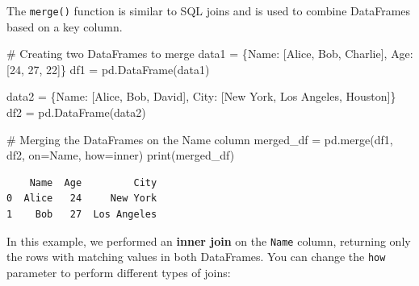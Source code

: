 \documentclass[
  letterpaper,
  DIV=11,
  numbers=noendperiod]{scrreprt}
\newenvironment{Shaded}{\begin{snugshade}}{\end{snugshade}}
\newcommand{\BuiltInTok}[1]{\textcolor[rgb]{0.00,0.23,0.31}{#1}}
\newcommand{\CommentTok}[1]{\textcolor[rgb]{0.37,0.37,0.37}{#1}}
\newcommand{\DecValTok}[1]{\textcolor[rgb]{0.68,0.00,0.00}{#1}}
\newcommand{\NormalTok}[1]{\textcolor[rgb]{0.00,0.23,0.31}{#1}}
\newcommand{\OperatorTok}[1]{\textcolor[rgb]{0.37,0.37,0.37}{#1}}
\newcommand{\StringTok}[1]{\textcolor[rgb]{0.13,0.47,0.30}{#1}}
\begin{document}
The \texttt{merge()} function is similar to SQL joins and is used to
combine DataFrames based on a key column.

\begin{Shaded}
\begin{Highlighting}[]
\CommentTok{\# Creating two DataFrames to merge}
\NormalTok{data1 }\OperatorTok{=}\NormalTok{ \{}\StringTok{\textquotesingle{}Name\textquotesingle{}}\NormalTok{: [}\StringTok{\textquotesingle{}Alice\textquotesingle{}}\NormalTok{, }\StringTok{\textquotesingle{}Bob\textquotesingle{}}\NormalTok{, }\StringTok{\textquotesingle{}Charlie\textquotesingle{}}\NormalTok{],}
         \StringTok{\textquotesingle{}Age\textquotesingle{}}\NormalTok{: [}\DecValTok{24}\NormalTok{, }\DecValTok{27}\NormalTok{, }\DecValTok{22}\NormalTok{]\}}
\NormalTok{df1 }\OperatorTok{=}\NormalTok{ pd.DataFrame(data1)}

\NormalTok{data2 }\OperatorTok{=}\NormalTok{ \{}\StringTok{\textquotesingle{}Name\textquotesingle{}}\NormalTok{: [}\StringTok{\textquotesingle{}Alice\textquotesingle{}}\NormalTok{, }\StringTok{\textquotesingle{}Bob\textquotesingle{}}\NormalTok{, }\StringTok{\textquotesingle{}David\textquotesingle{}}\NormalTok{],}
         \StringTok{\textquotesingle{}City\textquotesingle{}}\NormalTok{: [}\StringTok{\textquotesingle{}New York\textquotesingle{}}\NormalTok{, }\StringTok{\textquotesingle{}Los Angeles\textquotesingle{}}\NormalTok{, }\StringTok{\textquotesingle{}Houston\textquotesingle{}}\NormalTok{]\}}
\NormalTok{df2 }\OperatorTok{=}\NormalTok{ pd.DataFrame(data2)}

\CommentTok{\# Merging the DataFrames on the \textquotesingle{}Name\textquotesingle{} column}
\NormalTok{merged\_df }\OperatorTok{=}\NormalTok{ pd.merge(df1, df2, on}\OperatorTok{=}\StringTok{\textquotesingle{}Name\textquotesingle{}}\NormalTok{, how}\OperatorTok{=}\StringTok{\textquotesingle{}inner\textquotesingle{}}\NormalTok{)}
\BuiltInTok{print}\NormalTok{(merged\_df)}
\end{Highlighting}
\end{Shaded}

\begin{verbatim}
    Name  Age         City
0  Alice   24     New York
1    Bob   27  Los Angeles
\end{verbatim}

In this example, we performed an \textbf{inner join} on the
\texttt{Name} column, returning only the rows with matching values in
both DataFrames. You can change the \texttt{how} parameter to perform
different types of joins:
\end{document}
